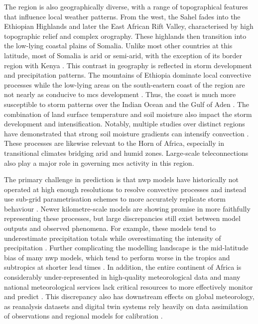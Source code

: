 The region is also geographically diverse, with a range of topographical features that influence local weather patterns. From the west, the Sahel fades into the Ethiopian Highlands and later the East African Rift Valley, characterised by high topographic relief and complex orography. These highlands then transition into the low-lying coastal plains of Somalia. Unlike most other countries at this latitude, most of Somalia is arid or semi-arid, with the exception of its border region with Kenya \citep{Beck2023}. This contrast in geography is reflected in storm development and precipitation patterns. The mountains of Ethiopia dominate local convective processes while the low-lying areas on the south-eastern coast of the region are not nearly as conducive to \acrshort{mcs} development \citep{Negash2024,Camberlin2024}. Thus, the coast is much more susceptible to storm patterns over the Indian Ocean and the Gulf of Aden \citep{Camberlin2024}. The combination of land surface temperature and soil moisture also impact the storm development and intensification. Notably, multiple studies over distinct regions have demonstrated that strong soil moisture gradients can intensify convection \citep{Barton2021,Klein2020,Taylor2017}. These processes are likewise relevant to the Horn of Africa, especially in transitional climates bridging arid and humid zones. Large-scale \glspl{teleconnection} also play a major role in governing \acrshort{mcs} activity in this region. 

The primary challenge in prediction is that \acrfull{nwp} models have historically not operated at high enough resolutions to resolve convective processes and instead use sub-grid parametrisation schemes to more accurately replicate storm behaviour \citep{Stevens2019,Yano2018}. Newer kilometre-scale models are showing promise in more faithfully representing these processes, but large discrepancies still exist between model outputs and observed phenomena. For example, these models tend to underestimate precipitation totals while overestimating the intensity of precipitation \citep{Feng2025,Stevens2019}. Further complicating the modelling landscape is the mid-latitude bias of many \acrshort{nwp} models, which tend to perform worse in the tropics and subtropics at shorter lead times \citep{Keane2025}. In addition, the entire continent of Africa is considerably under-represented in high-quality meteorological data and many national meteorological services lack critical resources to more effectively monitor and predict  \citep{Dinku2019,Kinyondo2018,Meque2021}. This discrepancy also has downstream effects on global meteorology, as reanalysis datasets and digital twin systems rely heavily on data assimilation of observations and regional models for calibration \citep{Linsenmeier2023,Valmassoi2023}. 

